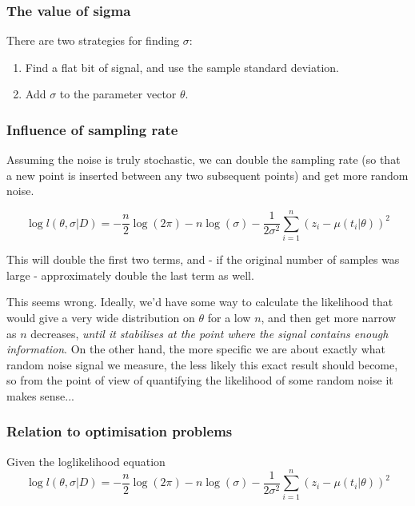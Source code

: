 \documentclass[preprint,authoryear,10pt]{elsarticle}
\begin{document}
\subsubsection{The value of sigma}

There are two strategies for finding $\sigma$:

\begin{enumerate}
\item Find a flat bit of signal, and use the sample standard deviation.
\item Add $\sigma$ to the parameter vector $\theta$.
\end{enumerate}



\subsubsection{Influence of sampling rate}

Assuming the noise is truly stochastic, we can double the sampling rate (so
 that a new point is inserted between any two subsequent points) and get more
 random noise.

\begin{equation}
\log l(\theta,\sigma|D) =
    - \frac{n}{2} \log(2\pi)
    - n \log(\sigma)
    - \frac{1}{2\sigma^2} \sum_{i=1}^n \left(z_i - \mu(t_i|\theta) \right)^2
\end{equation}

This will double the first two terms, and - if the original number of samples
 was large - approximately double the last term as well.

This seems wrong.
Ideally, we'd have some way to calculate the likelihood that would give a very
 wide distribution on $\theta$ for a low $n$, and then get more narrow as $n$
 decreases, \emph{until it stabilises at the point where the signal contains
 enough information}.
On the other hand, the more specific we are about exactly what random noise
 signal we measure, the less likely this exact result should become, so from
 the point of view of quantifying the likelihood of some random noise it makes
 sense...



\subsubsection{Relation to optimisation problems}

Given the loglikelihood equation
\begin{equation}
\log l(\theta,\sigma|D) =
    - \frac{n}{2} \log(2\pi)
    - n \log(\sigma)
    - \frac{1}{2\sigma^2} \sum_{i=1}^n \left(z_i - \mu(t_i|\theta) \right)^2
\end{equation}
\end{document}
